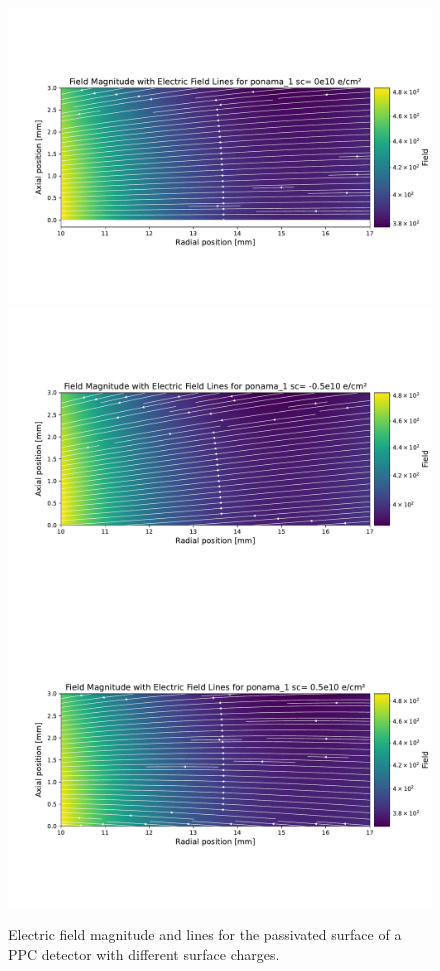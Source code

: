 \begin{figure} %
\centering
\includegraphics[trim={1cm 3.5cm 0.5cm 4.0cm},clip,width=0.99\linewidth]{ch3/figs/elect_field_lines_surface_ponama_1_sc_0.pdf}
\includegraphics[trim={1cm 3.5cm 0.5cm 4.0cm},clip,width=0.99\linewidth]{ch3/figs/elect_field_lines_surface_ponama_1_sc_-0.5.pdf}
\includegraphics[trim={1cm 3.5cm 0.5cm 4.0cm},clip,width=0.99\linewidth]{ch3/figs/elect_field_lines_surface_ponama_1_sc_0.5.pdf}
\caption{Electric field magnitude and lines for the passivated surface of a PPC detector with different surface charges.}
\label{ch3_fig_surface_field_sc0}
\end{figure}



